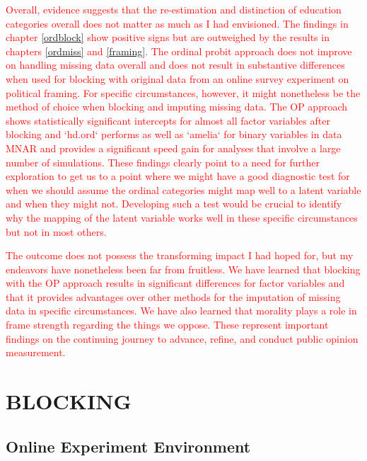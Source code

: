 \documentclass[12pt,econ]{sources/authesis}
\begin{document}
\textcolor{red}{Overall, evidence suggests that the re-estimation and distinction of education categories overall does not matter as much as I had envisioned. The findings in chapter \ref{ordblock} show positive signs but are outweighed by the results in chapters \ref{ordmiss} and \ref{framing}. The ordinal probit approach does not improve on handling missing data overall and does not result in substantive differences when used for blocking with original data from an online survey experiment on political framing. For specific circumstances, however, it might nonetheless be the method of choice when blocking and imputing missing data. The OP approach shows statistically significant intercepts for almost all factor variables after blocking and `hd.ord` performs as well as `amelia` for binary variables in data MNAR and provides a significant speed gain for analyses that involve a large number of simulations. These findings clearly point to a need for further exploration to get us to a point where we might have a good diagnostic test for when we should assume the ordinal categories might map well to a latent variable and when they might not. Developing such a test would be crucial to identify why the mapping of the latent variable works well in these specific circumstances but not in most others.}

\textcolor{red}{The outcome does not possess the transforming impact I had hoped for, but my endeavors have nonetheless been far from fruitless. We have learned that blocking with the OP approach results in significant differences for factor variables and that it provides advantages over other methods for the imputation of missing data in specific circumstances. We have also learned that morality plays a role in frame strength regarding the things we oppose. These represent important findings on the continuing journey to advance, refine, and conduct public opinion measurement.}

\appendix

\hypertarget{app-ordblock}{%
\chapter{BLOCKING}\label{app-ordblock}}

\hypertarget{app-ordblock-env}{%
\section{Online Experiment Environment}\label{app-ordblock-env}}
\end{document}
